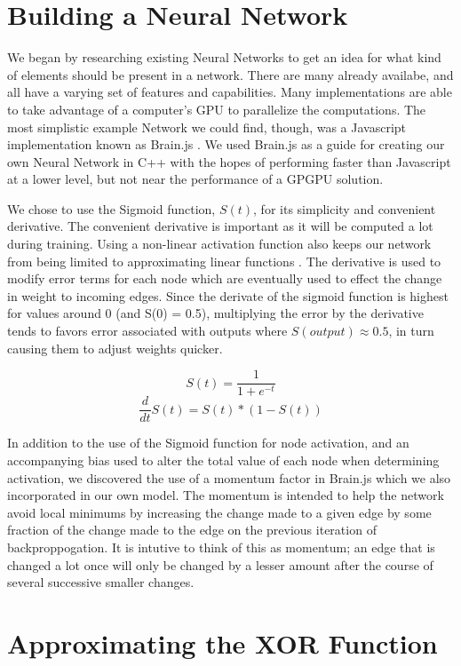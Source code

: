 \documentclass{article}
\begin{document}
\begin{multicols}{2}
\section{Building a Neural Network}

We began by researching existing Neural Networks to get an idea for what kind of elements should be present in a network. There are many already availabe, and all have a varying set of features and capabilities. Many implementations are able to take advantage of a computer's GPU to parallelize the computations. The most simplistic example Network we could find, though, was a Javascript implementation known as Brain.js \cite{brain}. We used Brain.js as a guide for creating our own Neural Network in C++ with the hopes of performing faster than Javascript at a lower level, but not near the performance of a GPGPU solution.

We chose to use the Sigmoid function, $S(t)$, for its simplicity and convenient derivative. The convenient derivative is important as it will be computed a lot during training. Using a non-linear activation function also keeps our network from being limited to approximating linear functions \cite{hornik}. The derivative is used to modify error terms for each node which are eventually used to effect the change in weight to incoming edges. Since the derivate of the sigmoid function is highest for values around 0 (and S(0) = 0.5), multiplying the error by the derivative tends to favors error associated with outputs where $S(output)\approx0.5$, in turn causing them to adjust weights quicker.

	\[S(t) = \frac{1}{1+e^{-t}}\]
	\[\frac{d}{dt}S(t) = S(t) * (1-S(t))\]

In addition to the use of the Sigmoid function for node activation, and an accompanying bias used to alter the total value of each node when determining activation, we discovered the use of a momentum factor in Brain.js which we also incorporated in our own model. The momentum is intended to help the network avoid local minimums by increasing the change made to a given edge by some fraction of the change made to the edge on the previous iteration of backproppogation. It is intutive to think of this as momentum; an edge that is changed a lot once will only be changed by a lesser amount after the course of several successive smaller changes.

\section{Approximating the XOR Function}


\end{multicols}
\end{document}
